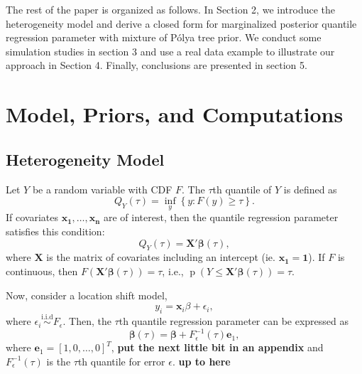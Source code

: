 \documentclass[12pt]{article}
\newcommand{\polya}{P\'{o}lya}
\DeclareMathOperator{\pr}{p}
\begin{document}
The rest of the paper is organized as follows. In Section 2, we
introduce the heterogeneity model and derive a closed form for
marginalized posterior quantile regression parameter with mixture of
\polya{} tree prior. We conduct some simulation studies in section 3 
and use a real
data example to illustrate our approach in Section 4. Finally, conclusions are
presented in section 5. 

\section{Model, Priors, and Computations}
\subsection{Heterogeneity Model}
Let $Y$ be a random variable with CDF $F$.  The $\tau$th quantile
of $Y$ is defined as 
\begin{displaymath}
  Q_Y(\tau) = \underset{y}{\inf} \left\{ y: F(y) \ge \tau \right\}.
\end{displaymath}
If covariates $\bm{x_1, \ldots, x_n}$ are of interest,
then the quantile regression parameter satisfies this
condition: 
\begin{displaymath}
  Q_Y(\tau) = \bm{X'\beta}(\tau),
\end{displaymath}
where $\bm{X}$ is the matrix of covariates including 
an intercept (ie. $\bm{x_1}=
\bm{1}$). 
If $F$ is continuous, then
$F(\bm{X'\beta}(\tau)) = \tau$, i.e., $\pr(Y \le \bm{X'\beta}(\tau)) =
\tau$. 

Now, consider a location shift model, 
\begin{displaymath}
  y_i = \bm{x}_i\beta + \epsilon_i, 
\end{displaymath}
where $\epsilon_i \stackrel{\text{i.i.d}}{\sim} F_{\epsilon}$. Then, the $\tau$th
quantile regression parameter can be expressed as 
\begin{equation}
  \label{eq:1}
  \bm{\beta}(\tau) = \bm{\beta} + F^{-1}_{\epsilon}(\tau) \bm{e}_1,
\end{equation}
where $\bm{e}_1 = [1, 0, \ldots, 0]^T$,  {\bf put the next little bit
  in an appendix} and $F^{-1}_{\epsilon}(\tau)$ is
the $\tau$th quantile for error $\epsilon$. 
{\bf up to here}
\end{document}
